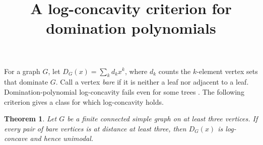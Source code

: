 \documentclass[10pt]{article}
\title{A log-concavity criterion for domination polynomials}
\author{}
\date{}
\newtheorem{theorem}{Theorem}
\begin{document}
\maketitle
\vspace{-2.5em}

For a graph $G$, let $D_G(x)=\sum_k d_kx^k$, where $d_k$ counts the $k$-element vertex sets that dominate $G$. Call a vertex \emph{bare} if it is neither a leaf nor adjacent to a leaf. Domination-polynomial log-concavity fails even for some trees \cite{trees}. The following criterion gives a class for which log-concavity holds.

\begin{theorem}
Let $G$ be a finite connected simple graph on at least three vertices. If every pair of bare vertices is at distance at least three, then $D_G(x)$ is log-concave and hence unimodal.
\end{theorem}
\end{document}
